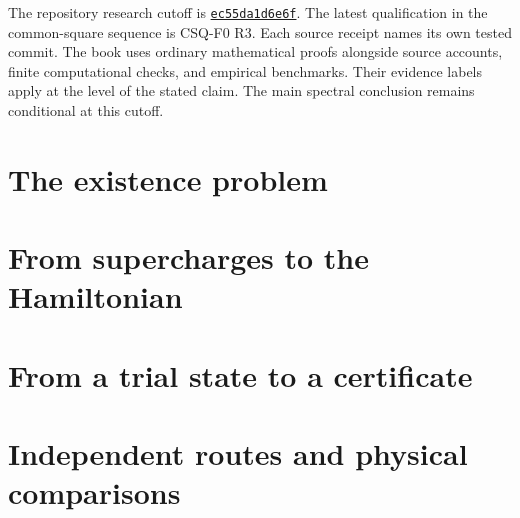 \documentclass[11pt,oneside,openany]{book}
\theoremstyle{definition}
\newcommand{\snap}{ec55da1d6e6ffe50fedc1ea722f63eb470fae021}
\begin{document}
The repository research cutoff is \href{https://github.com/etblink/math/commit/\snap}{\texttt{ec55da1d6e6f}}. The latest qualification in the common-square sequence is CSQ-F0 R3. Each source receipt names its own tested commit. The book uses ordinary mathematical proofs alongside source accounts, finite computational checks, and empirical benchmarks. Their evidence labels apply at the level of the stated claim. The main spectral conclusion remains conditional at this cutoff.

\tableofcontents
\mainmatter
\part{The existence problem}


\part{From supercharges to the Hamiltonian}



\part{From a trial state to a certificate}




\part{Independent routes and physical comparisons}



\appendix

\backmatter

\end{document}

